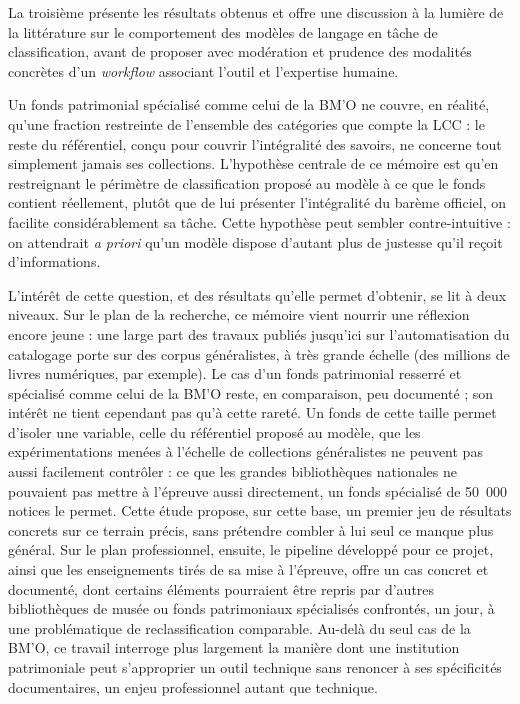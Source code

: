 La troisième présente les résultats obtenus et offre une discussion à la lumière
de la littérature sur le comportement des modèles de langage en tâche de
classification, avant de proposer avec modération et prudence des modalités
concrètes d'un \emph{workflow} associant l'outil et l'expertise humaine. 


Un fonds patrimonial spécialisé comme celui de la BM'O ne couvre, en réalité, qu'une fraction restreinte de l'ensemble des catégories que compte la LCC : le reste du référentiel, conçu pour couvrir l'intégralité des savoirs, ne concerne tout simplement jamais ses collections. L'hypothèse centrale de ce mémoire est qu'en restreignant le périmètre de classification proposé au modèle à ce que le fonds contient réellement, plutôt que de lui présenter l'intégralité du barème officiel, on facilite considérablement sa tâche. Cette hypothèse peut sembler contre-intuitive : on attendrait \emph{a priori} qu'un modèle dispose d'autant plus de justesse qu'il reçoit d'informations. 

L'intérêt de cette question, et des résultats qu'elle permet d'obtenir, se lit à deux niveaux. Sur le plan de la recherche, ce mémoire vient nourrir une réflexion encore jeune : une large part des travaux publiés jusqu'ici sur l'automatisation du catalogage porte sur des corpus généralistes, à très grande échelle (des millions de livres numériques, par exemple). Le cas d'un fonds patrimonial resserré et spécialisé comme celui de la BM'O reste, en comparaison, peu documenté ; son intérêt ne tient cependant pas qu'à cette rareté. Un fonds de cette taille permet d'isoler une variable, celle du référentiel proposé au modèle, que les expérimentations menées à l'échelle de collections généralistes ne peuvent pas aussi facilement contrôler : ce que les grandes bibliothèques nationales ne pouvaient pas mettre à l'épreuve aussi directement, un fonds spécialisé de 50~000 notices le permet. Cette étude propose, sur cette base, un premier jeu de résultats concrets sur ce terrain précis, sans prétendre combler à lui seul ce manque plus général. Sur le plan professionnel, ensuite, le \gls{pipeline} développé pour ce projet, ainsi que les enseignements tirés de sa mise à l'épreuve, offre un cas concret et documenté, dont certains éléments pourraient être repris par d'autres bibliothèques de musée ou fonds patrimoniaux spécialisés confrontés, un jour, à une problématique de reclassification comparable. Au-delà du seul cas de la BM'O, ce travail interroge plus largement la manière dont une institution patrimoniale peut s'approprier un outil technique sans renoncer à ses spécificités documentaires, un enjeu professionnel autant que technique.

